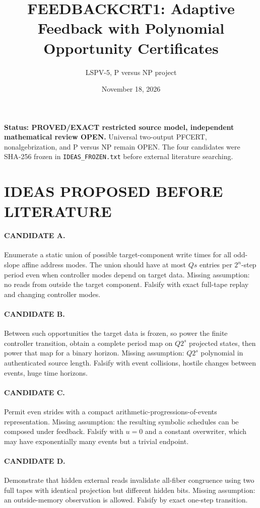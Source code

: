\documentclass[11pt]{article}
\title{FEEDBACKCRT1: Adaptive Feedback with Polynomial Opportunity Certificates}
\author{LSPV-5, P versus NP project}
\date{November 18, 2026}
\begin{document}
\maketitle
\noindent\textbf{Status: PROVED/EXACT restricted source model, independent mathematical review OPEN.} Universal two-output PFCERT, nonalgebrization, and P versus NP remain OPEN. The four candidates were SHA-256 frozen in \texttt{IDEAS\_FROZEN.txt} before external literature searching.

\section{IDEAS PROPOSED BEFORE LITERATURE}
\paragraph{CANDIDATE A.} Enumerate a static union of possible target-component write times for all odd-slope affine address modes. The union should have at most $Qs$ entries per $2^n$-step period even when controller modes depend on target data. Missing assumption: no reads from outside the target component. Falsify with exact full-tape replay and changing controller modes.
\paragraph{CANDIDATE B.} Between such opportunities the target data is frozen, so power the finite controller transition, obtain a complete period map on $Q2^s$ projected states, then power that map for a binary horizon. Missing assumption: $Q2^s$ polynomial in authenticated source length. Falsify with event collisions, hostile changes between events, huge time horizons.
\paragraph{CANDIDATE C.} Permit even strides with a compact arithmetic-progressions-of-events representation. Missing assumption: the resulting symbolic schedules can be composed under feedback. Falsify with $u=0$ and a constant overwriter, which may have exponentially many events but a trivial endpoint.
\paragraph{CANDIDATE D.} Demonstrate that hidden external reads invalidate all-fiber congruence using two full tapes with identical projection but different hidden bits. Missing assumption: an outside-memory observation is allowed. Falsify by exact one-step transition.
\end{document}
